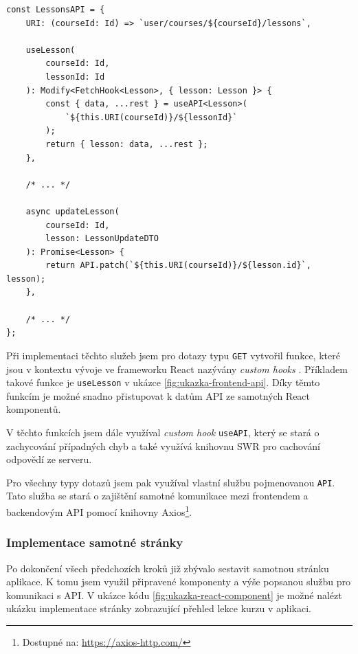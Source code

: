 \begin{listing}[!ht]
    \begin{verbatim}
const LessonsAPI = {
    URI: (courseId: Id) => `user/courses/${courseId}/lessons`,

    useLesson(
        courseId: Id, 
        lessonId: Id
    ): Modify<FetchHook<Lesson>, { lesson: Lesson }> {
        const { data, ...rest } = useAPI<Lesson>(
            `${this.URI(courseId)}/${lessonId}`
        );
        return { lesson: data, ...rest };
    },

    /* ... */

    async updateLesson(
        courseId: Id, 
        lesson: LessonUpdateDTO
    ): Promise<Lesson> {
        return API.patch(`${this.URI(courseId)}/${lesson.id}`, lesson);
    },
    
    /* ... */
};
    \end{verbatim}
    \caption{Ukázka služby LessonsAPI}
    \label{fig:ukazka-frontend-api}
\end{listing}

Při implementaci těchto služeb jsem pro dotazy typu \texttt{GET} vytvořil funkce, které jsou v kontextu vývoje ve frameworku React nazývány \textit{custom hooks} \cite{ReactCustomHook}. Příkladem takové funkce je \texttt{useLesson} v ukázce \ref{fig:ukazka-frontend-api}. Díky těmto funkcím je možné snadno přistupovat k datům API ze samotných React komponentů.

V těchto funkcích jsem dále využíval \textit{custom hook} \texttt{useAPI}, který se stará o zachycování případných chyb a také využívá knihovnu SWR pro cachování odpovědí ze serveru.

Pro všechny typy dotazů jsem pak využíval vlastní službu pojmenovanou \texttt{API}. Tato služba se stará o zajištění samotné komunikace mezi frontendem a backendovým API pomocí knihovny Axios\footnote{Dostupné na: \href{https://axios-http.com/}{https://axios-http.com/}}.

\subsubsection{Implementace samotné stránky}

Po dokončení všech předchozích kroků již zbývalo sestavit samotnou stránku aplikace. K tomu jsem využil připravené komponenty a výše popsanou službu pro komunikaci s API. V ukázce kódu \ref{fig:ukazka-react-component} je možné nalézt ukázku implementace stránky zobrazující přehled lekce kurzu v aplikaci.

